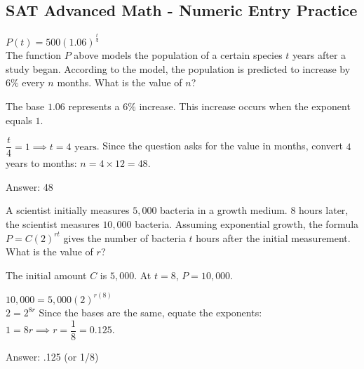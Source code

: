 \documentclass[11pt,paper=a4,answers]{exam}
\begin{document}
\begin{questions}
\pointsinrightmargin
\pointsdroppedatright
\marksnotpoints
{}
\pointformat{\boldmath\themarginpoints}
\bracketedpoints

\section*{SAT Advanced Math - Numeric Entry Practice}

\question
$P(t) = 500(1.06)^{\frac{t}{4}}$ \\
The function $P$ above models the population of a certain species $t$ years after a study began. According to the model, the population is predicted to increase by $6\%$ every $n$ months. What is the value of $n$?

\begin{solution}
The base $1.06$ represents a $6\%$ increase. This increase occurs when the exponent equals $1$.
\vspace{5pt}
\begin{center}
$\dfrac{t}{4} = 1 \implies t = 4 \text{ years}$.
\vspace{5pt}
Since the question asks for the value in months, convert $4$ years to months:
\vspace{5pt}
$n = 4 \times 12 = 48$.
\end{center}
\vspace{5pt}
Answer: \colorbox{yellow!100}{48}
\end{solution}

\vspace{1cm}

\question
A scientist initially measures $5,000$ bacteria in a growth medium. $8$ hours later, the scientist measures $10,000$ bacteria. Assuming exponential growth, the formula $P = C(2)^{rt}$ gives the number of bacteria $t$ hours after the initial measurement. What is the value of $r$?

\begin{solution}
The initial amount $C$ is $5,000$. At $t = 8$, $P = 10,000$.
\vspace{5pt}
\begin{center}
$10,000 = 5,000(2)^{r(8)}$ \\
$2 = 2^{8r}$
\vspace{5pt}
Since the bases are the same, equate the exponents:
\vspace{5pt}
$1 = 8r \implies r = \dfrac{1}{8} = 0.125$.
\end{center}
\vspace{5pt}
Answer: \colorbox{yellow!100}{.125} (or 1/8)
\end{solution}


\end{questions}
\end{document}
